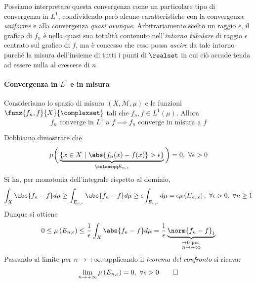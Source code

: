 Possiamo interpretare questa convergenza come un particolare tipo di convergenza in $L^1$, condividendo però alcune caratteristiche con la convergenza \textit{uniforme} e alla convergenza \textit{quasi ovunque}. Arbitrariamente scelto un raggio $\epsilon$, il grafico di $f_n$ è nella quasi sua totalità contenuto nell'\textit{intorno tubulare} di raggio $\epsilon$ centrato sul grafico di $f$, ma è concesso che esso possa \textit{uscire} da tale intorno purché la misura dell'insieme di tutti i punti di $\realset$ in cui ciò accade tenda ad essere nulla al crescere di $n$.
\paragraph{Convergenza in {$L^1$} e in misura}
\begin{theorema}
	Consideriamo lo spazio di misura $\left(X,\mathcal{M},\mu\right)$ e le funzioni $\funz{f_n,f}{X}{\complexset}$ tali che $f_n,f\in L^1\left(\mu\right)$.
	Allora
	\begin{equation}
		f_n\text{ converge in }L^1\text{ a }f\implies f_n\text{ converge in misura a }f
	\end{equation}
\end{theorema}
\begin{demonstration}
	Dobbiamo dimostrare che
	\begin{equation*}
		\mu\bigg(\underbrace{\left\{x\in X\ \middle| \ \abs{f_n(x)-f(x)}>\epsilon\right\}}_{\coloneqq E_{n,\epsilon}}\bigg)=0,\ \forall \epsilon>0
	\end{equation*}
	Si ha, per monotonia dell'integrale rispetto al dominio,
	\begin{equation*}
		\int_X\abs{f_n-f}d\mu\geq\int_{E_{n,\epsilon}}\abs{f_n-f}d\mu\geq\epsilon\int_{E_{n,\epsilon}}d\mu=\epsilon\mu\left(E_{n.,\epsilon}\right),\ \forall \epsilon>0,\ \forall n\geq 1
	\end{equation*}
	Dunque si ottiene
	\begin{equation*}
		0\leq \mu\left(E_{n,\epsilon}\right)\leq \frac{1}{\epsilon}\int_X\abs{f_n-f}d\mu=\frac{1}{\epsilon}\underbrace{\norm{f_n-f}_1}_{\substack{\to 0\text{ per }\\n\to+\infty}}
	\end{equation*}
	Passando al limite per $n\to+\infty$, applicando il \textit{teorema del confronto} si ricava:
	\begin{equation*}
		\lim_{n\to+\infty}\mu\left(E_{n,\epsilon}\right)=0,\ \forall \epsilon>0\qedhere
	\end{equation*}
\end{demonstration}
